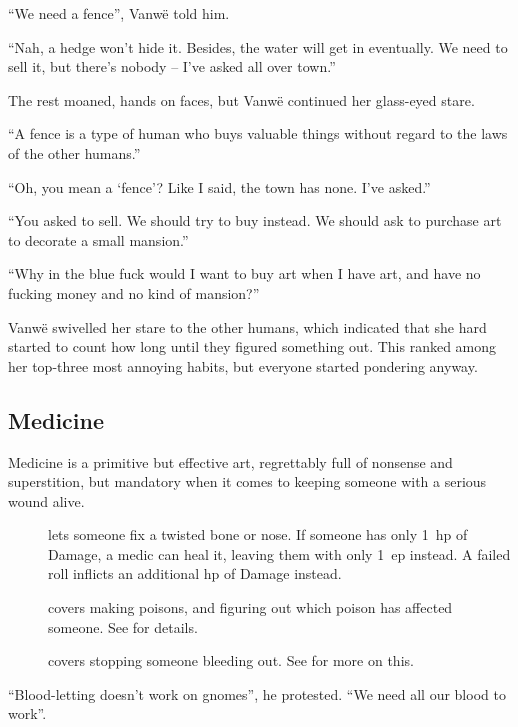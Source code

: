 \begin{multicols}{2}
\begin{exampletext}
  ``We need a fence'', Vanw\"e told him.

  ``Nah, a hedge won't hide it.
  Besides, the water will get in eventually.
  We need to sell it, but there's nobody -- I've asked all over town.''

  The rest moaned, hands on faces, but Vanw\"e continued her glass-eyed stare.

  ``A fence is a type of human who buys valuable things without regard to the laws of the other humans.''

  ``Oh, you mean a `fence'?
  Like I said, the town has none.
  I've asked.''

  ``You asked to sell.
  We should try to buy instead.
  We should ask to purchase art to decorate a small mansion.''

  ``Why in the blue fuck would I want to buy art when I have art, and have no fucking money and no kind of mansion?''

  Vanw\"e swivelled her stare to the other humans, which indicated that she hard started to count how long until they figured something out.
  This ranked among her top-three most annoying habits, but everyone started pondering anyway.
\end{exampletext}

\subsection{Medicine}

Medicine is a primitive but effective art, regrettably full of nonsense and superstition, but mandatory when it comes to keeping someone with a serious wound alive.

\begin{description}
  \item[]
    lets someone fix a twisted bone or nose.
    If someone has only 1~\gls{hp} of Damage, a medic can heal it, leaving them with only 1~\gls{ep} instead.
    A failed roll inflicts an additional \gls{hp} of Damage instead.
  \item[]
    covers making poisons, and figuring out which poison has affected someone.
    See  for details.
  \item[]
    covers stopping someone bleeding out.
    See  for more on this.
\end{description}

\begin{exampletext}
  ``Blood-letting doesn't work on gnomes'', he protested.
  ``We need all our blood to work''.


\end{exampletext}
\end{multicols}
